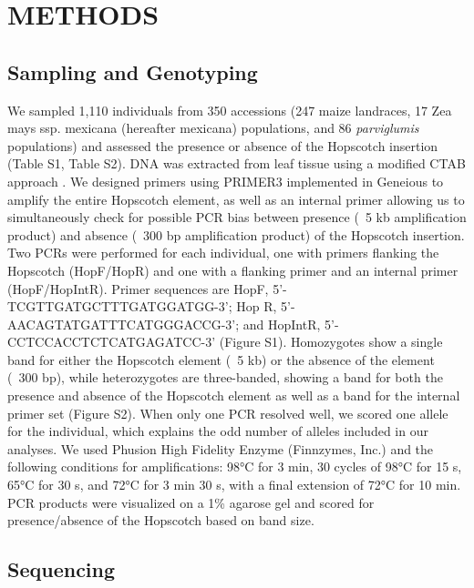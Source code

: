 \documentclass[12pt]{article}
\begin{document}
 
\section{METHODS}

\subsection{Sampling and Genotyping}

We sampled 1,110 individuals from 350 accessions (247 maize landraces, 17 Zea mays ssp. mexicana (hereafter mexicana) populations, and 86 \emph{parviglumis} populations) and assessed the presence or absence of the Hopscotch insertion (Table S1, Table S2). DNA was extracted from leaf tissue using a modified CTAB approach \cite{Doyle and Doyle 1990, Maloof et al 1984}. We designed primers using PRIMER3 \cite{Rozen and Skaletsky 2000} implemented in Geneious \cite{Kearse et al 2012} to amplify the entire Hopscotch element, as well as an internal primer allowing us to simultaneously check for possible PCR bias between presence (~5 kb amplification product) and absence (~300 bp amplification product) of the Hopscotch insertion. Two PCRs were performed for each individual, one with primers flanking the Hopscotch (HopF/HopR) and one with a flanking primer and an internal primer (HopF/HopIntR). Primer sequences are HopF, 5'-TCGTTGATGCTTTGATGGATGG-3'; 
Hop R, 5'-AACAGTATGATTTCATGGGACCG-3'; and HopIntR, 5'-CCTCCACCTCTCATGAGATCC-3' (Figure S1). Homozygotes show a single band for either the Hopscotch element (~5 kb) or the absence of the element (~300 bp), while heterozygotes are three-banded, showing a band for both the presence and absence of the Hopscotch element as well as a band for the internal primer set (Figure S2). When only one PCR resolved well, we scored one allele for the individual, which explains the odd number of alleles included in our analyses. We used Phusion High Fidelity Enzyme (Finnzymes, Inc.) and the following conditions for amplifications: 98°C for 3 min, 30 cycles of 98°C for 15 s, 65°C for 30 s, and 72°C for 3 min 30 s, with a final extension of 72°C for 10 min. PCR products were visualized on a 1\% agarose gel and scored for presence/absence of the Hopscotch based on band size.

\subsection{Sequencing}
\end{document}
